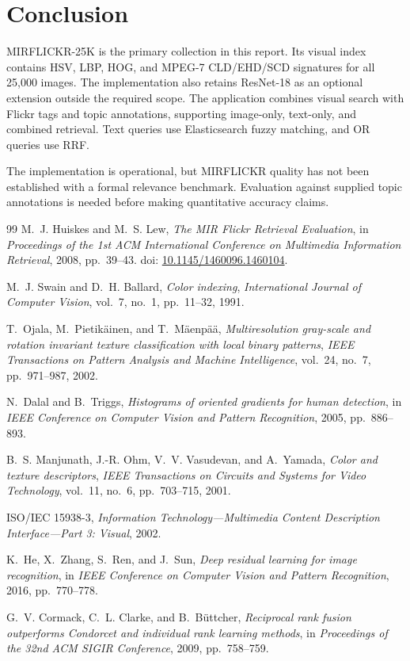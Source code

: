 \documentclass[12pt,a4paper]{article}
\begin{document}
\section{Conclusion}
MIRFLICKR-25K is the primary collection in this report. Its visual index
contains HSV, LBP, HOG, and MPEG-7 CLD/EHD/SCD signatures for all 25,000 images.
The implementation also retains ResNet-18 as an optional extension outside
the required scope. The application combines visual search with Flickr tags and
topic annotations, supporting image-only, text-only, and combined retrieval.
Text queries use Elasticsearch fuzzy matching, and OR queries use RRF.

The implementation is operational, but MIRFLICKR quality has not been
established with a formal relevance benchmark. Evaluation against supplied
topic annotations is needed before making quantitative accuracy claims.

\begin{thebibliography}{99}
M.~J. Huiskes and M.~S. Lew,
\emph{The MIR Flickr Retrieval Evaluation},
in \emph{Proceedings of the 1st ACM International Conference on Multimedia
Information Retrieval}, 2008, pp.~39--43.
doi: \href{https://doi.org/10.1145/1460096.1460104}
{10.1145/1460096.1460104}.

M.~J. Swain and D.~H. Ballard, \emph{Color indexing},
\emph{International Journal of Computer Vision}, vol.~7, no.~1,
pp.~11--32, 1991.

T.~Ojala, M.~Pietik{\"a}inen, and T.~M{\"a}enp{\"a}{\"a},
\emph{Multiresolution gray-scale and rotation invariant texture classification
with local binary patterns},
\emph{IEEE Transactions on Pattern Analysis and Machine Intelligence},
vol.~24, no.~7, pp.~971--987, 2002.

N.~Dalal and B.~Triggs,
\emph{Histograms of oriented gradients for human detection},
in \emph{IEEE Conference on Computer Vision and Pattern Recognition}, 2005,
pp.~886--893.

B.~S. Manjunath, J.-R. Ohm, V.~V. Vasudevan, and A.~Yamada,
\emph{Color and texture descriptors},
\emph{IEEE Transactions on Circuits and Systems for Video Technology},
vol.~11, no.~6, pp.~703--715, 2001.

ISO/IEC 15938-3, \emph{Information Technology---Multimedia Content Description
Interface---Part 3: Visual}, 2002.

K.~He, X.~Zhang, S.~Ren, and J.~Sun,
\emph{Deep residual learning for image recognition},
in \emph{IEEE Conference on Computer Vision and Pattern Recognition}, 2016,
pp.~770--778.

G.~V. Cormack, C.~L. Clarke, and B.~B{\"u}ttcher,
\emph{Reciprocal rank fusion outperforms Condorcet and individual rank learning
methods},
in \emph{Proceedings of the 32nd ACM SIGIR Conference}, 2009,
pp.~758--759.
\end{thebibliography}
\end{document}
